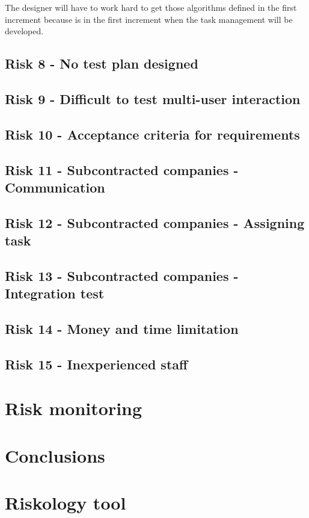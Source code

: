 \documentclass[11pt]{article}
\begin{document}
The designer will have to work hard to get those algorithms defined in the first increment because is in the first increment when the task management will be developed.
\subsection{Risk 8 - No test plan designed}
\subsection{Risk 9 - Difficult to test multi-user interaction}
\subsection{Risk 10 - Acceptance criteria for requirements}
\subsection{Risk 11 - Subcontracted companies - Communication}
\subsection{Risk 12 - Subcontracted companies - Assigning task}
\subsection{Risk 13 - Subcontracted companies - Integration test}
\subsection{Risk 14 - Money and time limitation}
\subsection{Risk 15 - Inexperienced staff}




\section{Risk monitoring}


\section{Conclusions}

\appendix

\section{Riskology tool}
\end{document}

